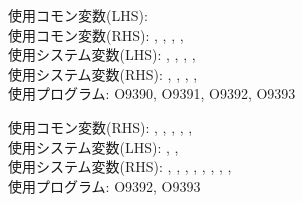 \clearpage

\begin{hosoku}
使用コモン変数(LHS): \\
使用コモン変数(RHS): , , , , \\
使用システム変数(LHS): , , , , \\
使用システム変数(RHS): , , , , \\
使用プログラム: O9390, O9391, O9392, O9393
\end{hosoku}


\clearpage

\begin{hosoku}
使用コモン変数(RHS): , , , , , \\
使用システム変数(LHS): , , \\
使用システム変数(RHS): , , , , , , , , \\
使用プログラム: O9392, O9393
\end{hosoku}


